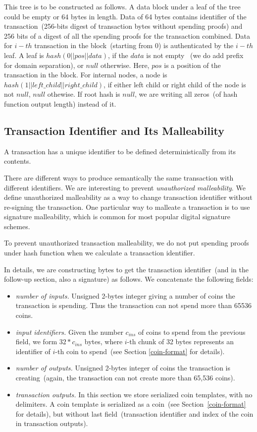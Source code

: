 \documentclass[]{article}   %
\newcommand{\coin}{coin}
\begin{document}
This tree is to be constructed as follows. A data block under a leaf of the tree could be empty or 64 bytes in length.
Data of 64 bytes contains identifier of the transaction~(256-bits digest of transaction bytes without spending proofs)
and 256 bits of a digest of all the spending proofs for the transaction combined. Data for $i-th$ transaction
in the block~(starting from 0) is authenticated by the $i-th$ leaf.
A leaf is $hash(0 || pos || data)$, if the $data$ is not empty
~(we do add prefix for domain separation), or $null$ otherwise. Here, $pos$ is a position of the transaction in the block.
 For internal nodes, a node is $hash(1 || left\_child || right\_child)$, if either left child or right child of the
 node is not $null$, $null$ othewise. If root hash is $null$, we are writing all zeros~(of hash function output length)
 instead of it.


\subsection{Transaction Identifier and Its Malleability}
\label{tx-identifier}

A transaction has a unique identifier to be defined deterministically from its contents.

There are different ways to produce semantically the same transaction with different identifiers. We are interesting
to prevent {\em unauthorized malleability}. We define unauthorized malleability as a way to change transaction
identifier without re-signing the transaction. One particular way to malleate a transaction is to use signature
malleability, which is common for most popular digital signature schemes.

To prevent unauthorized transaction malleability, we do not put spending proofs under hash function when we calculate a
transaction identifier.

In details, we are constructing bytes to get the transaction identifier~(and in the follow-up section, also a signature)
as follows. We concatenate the following fields:

\begin{itemize}
    \item{\em number of inputs.} Unsigned 2-bytes integer giving a number of \coin{}s the transaction is spending. Thus
    the transaction can not spend more than 65536 \coin{}s.
    \item{\em input identifiers.} Given the number $c_{ins}$ of \coin{}s to spend from the previous field, we form
    $32 * c_{ins}$ bytes, where $i$-th chunk of 32 bytes represents an identifier of $i$-th \coin{} to spend~(see Section
    \ref{coin-format} for details).
    \item{\em number of outputs.} Unsigned 2-bytes integer of \coin{}s the transaction is creating~(again, the
    transaction can not create more than 65,536 \coin{}s).
    \item{\em transaction outputs.} In this section we store serialized \coin{} templates, with no delimiters. A \coin{}
    template is serialized as a \coin{}~(see Section~\ref{coin-format} for details), but without last field~(transaction
    identifier and index of the \coin{} in transaction outputs).
\end{itemize}
\end{document}
